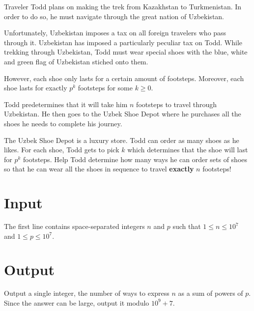 
Traveler Todd plans on making the trek from Kazakhstan to Turkmenistan.
In order to do so, he must navigate through the great nation of Uzbekistan.

\medskip

Unfortunately, Uzbekistan imposes a tax on all foreign travelers who pass
through it. Uzbekistan has imposed a particularly peculiar tax on Todd.
While trekking through Uzbekistan, Todd must wear special shoes with the
blue, white and green flag of Uzbekistan stiched onto them.

\medskip

However, each shoe only lasts for a certain amount of footsteps. Moreover,
each shoe lasts for exactly $p^k$ footsteps for some $k \ge 0$.

\medskip

Todd predetermines that it will take him $n$ footsteps to travel through
Uzbekistan. He then goes to the Uzbek Shoe Depot where he purchases all
the shoes he needs to complete his journey.

\medskip

The Uzbek Shoe Depot is a luxury store. Todd can order as many shoes as he
likes. For each shoe, Todd gets to pick $k$ which determines that the shoe
will last for $p^k$ footsteps. Help Todd determine how many ways he can
order sets of shoes so that he can wear all the shoes in sequence to travel
\textbf{exactly} $n$ footsteps!


\section*{Input}
The first line contains space-separated integers $n$ and $p$ such that
$1 \leq n \leq 10^7$ and $1 \leq p \leq 10^7$.

\section*{Output}
Output a single integer, the number of ways to express $n$ as a sum of
powers of $p$. Since the answer can be large, output it modulo $10^9 + 7$.
